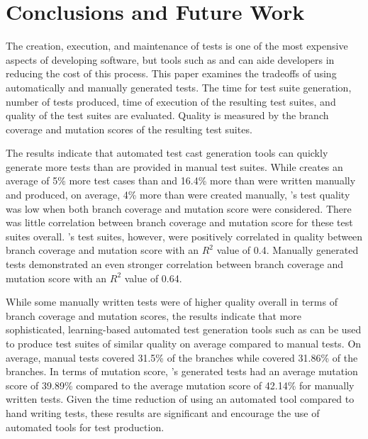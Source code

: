 
\section{Conclusions and Future Work}
\label{sec:conclusion}

The creation, execution, and maintenance of tests is one of the most expensive aspects of developing software, but tools
such as \codepro and \evo can aide developers in reducing the cost of this process.  This paper examines the
tradeoffs of using automatically and manually generated tests.  The time for test suite generation, number of tests
produced, time of execution of the resulting test suites, and quality of the test suites are evaluated.  Quality is
measured by the branch coverage and mutation scores of the resulting test suites.

The results indicate that automated test cast generation tools can quickly generate more tests than are provided in manual test suites.  While \codepro creates an average of 5\% more test cases than \evo and 16.4\% more than were written manually and \evo produced, on average, 4\% more than were created manually, \codepro's test quality was low when both branch coverage and mutation score were considered.  There was little correlation between branch coverage and mutation score for these test suites overall.  \evo's test suites, however, were positively correlated in quality between branch coverage and mutation score with an $R^2$ value of 0.4.  Manually generated tests demonstrated an even stronger correlation between branch coverage and mutation score with an $R^2$ value of 0.64.  

While some manually written tests were of higher quality overall in terms of branch coverage and mutation scores, the results indicate that more sophisticated, learning-based automated test generation tools such as \evo can be used to produce test suites of similar quality on average compared to manual tests.  On average, manual tests covered 31.5\% of the branches while  \evo covered 31.86\% of the branches. In terms of mutation score, \evo's generated tests had an average mutation score of 39.89\% compared to the average mutation score of 42.14\% for manually written tests.  Given the time reduction of using an automated tool compared to hand writing tests, these results are significant and encourage the use of automated tools for test production.  

